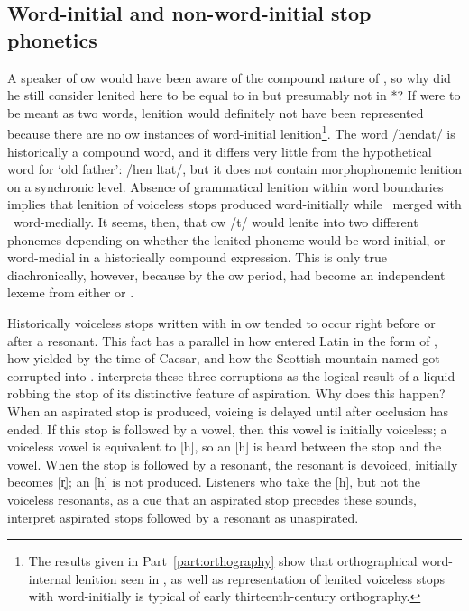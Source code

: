 \subsection{Word-initial and non-word-initial stop phonetics}
\label{sec:word-initial-non}
A speaker of \gls{ow} would have been aware of the compound nature of , so why did he still consider lenited  here to be equal to  in  but presumably not in *? If  were to be meant  as two words, lenition would definitely not have been represented because there are no \gls{ow} instances of word-initial lenition\footnote{The results given in Part~\ref{part:orthography} show that orthographical word-internal lenition seen in , as well as representation of lenited voiceless stops with  word-initially is typical of early thirteenth-century orthography.}.  The word  /hendat/ is historically  a compound word, and it differs very little from the hypothetical word for `old father':  /hen \gls{l}tat/, but it does not contain morphophonemic lenition on a synchronic level. Absence of grammatical lenition within word boundaries implies that lenition of voiceless stops produced \lT word-initially while \lT\  merged with \xD\ word-medially. It seems, then, that \gls{ow} /t/ would lenite into two different phonemes depending on whether the lenited phoneme would be word-initial, or word-medial in a historically compound expression. This is only true diachronically, however, because by the \gls{ow} period,  had become an independent lexeme from either  or . 

Historically voiceless stops written with  in \gls{ow} tended to occur right before or after a resonant. This fact has a parallel in how  entered Latin in the form of , how  yielded  by the time of Caesar, and how the Scottish mountain named  got corrupted into . \textcite[§~25]{koch_*cothairche_1990} interprets these three corruptions as the logical result of a liquid robbing the stop of its distinctive feature of aspiration. Why does this happen? When an aspirated stop is produced, voicing is delayed until after occlusion has ended. If this stop is followed by a vowel, then this vowel is initially voiceless; a voiceless vowel is equivalent to [h], so an [h] is heard between the stop and the vowel. When the stop is followed by a resonant, the resonant is devoiced, \eg [r] initially becomes [r̥]; an [h] is not produced. Listeners who take the [h], but not the voiceless resonants, as a cue that an aspirated stop precedes these sounds, interpret aspirated stops followed by a resonant as unaspirated.

